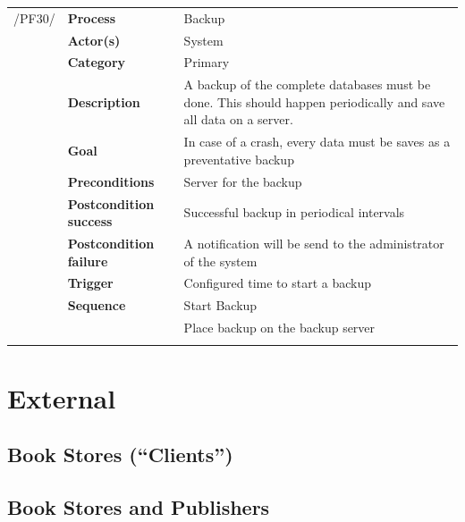 \documentclass[11pt,a4paper,oneside,svgnames]{report}
\begin{document}
\noindent
\begin{tabular}{p{1.5cm}p{3cm}p{8cm}}
\cellcolor{white}/PF30/	& \textbf{Process} & Backup\\
\cellcolor{white}		& \textbf{Actor(s)} & System\\
\cellcolor{white}		& \textbf{Category} & Primary\\
\cellcolor{white}		& \textbf{Description}	 & A backup of the complete databases must be done. This should happen periodically and save all data on a server.\\
\cellcolor{white}		& \textbf{Goal} & In case of a crash, every data must be saves as a preventative backup\\
\cellcolor{white}		& \textbf{Preconditions} & Server for the backup\\
\cellcolor{white}		& \textbf{Postcondition success} & Successful backup in periodical intervals\\
\cellcolor{white}		& \textbf{Postcondition failure} & A notification will be send to the administrator of the system\\
\cellcolor{white}		& \textbf{Trigger} & Configured time to start a backup\\
\cellcolor{white}		& \textbf{Sequence} & Start Backup\\
\cellcolor{white}		& & Place backup on the backup server\\
\cellcolor{white}\hfill \\
\end{tabular}

\section{External}
\subsection{Book Stores (``Clients'')}

\subsection{Book Stores and Publishers}
\end{document}
